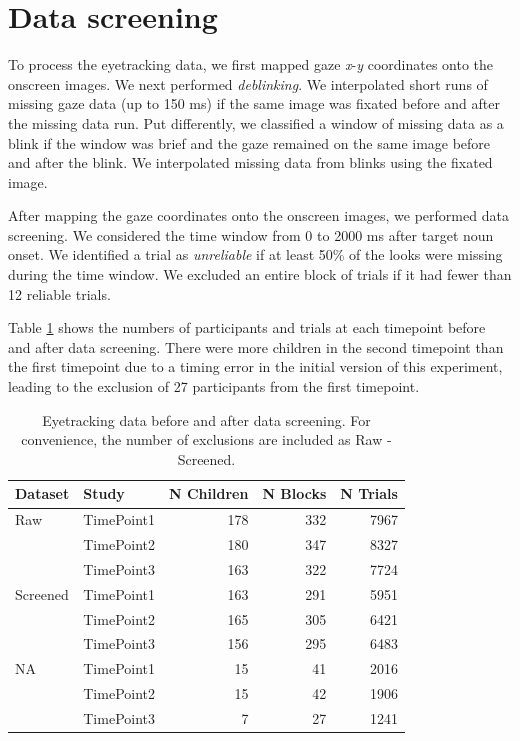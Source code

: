 \documentclass [11pt, proquest] {uwthesis}[2015/03/03]
\begin{document}
\section{Data screening}\label{data-screening}

To process the eyetracking data, we first mapped gaze \emph{x}-\emph{y}
coordinates onto the onscreen images. We next performed
\emph{deblinking}. We interpolated short runs of missing gaze data (up
to 150 ms) if the same image was fixated before and after the missing
data run. Put differently, we classified a window of missing data as a
blink if the window was brief and the gaze remained on the same image
before and after the blink. We interpolated missing data from blinks
using the fixated image.

After mapping the gaze coordinates onto the onscreen images, we
performed data screening. We considered the time window from 0 to 2000
ms after target noun onset. We identified a trial as \emph{unreliable}
if at least 50\% of the looks were missing during the time window. We
excluded an entire block of trials if it had fewer than 12 reliable
trials.

Table \ref{tab:screening-counts} shows the numbers of participants and
trials at each timepoint before and after data screening. There were
more children in the second timepoint than the first timepoint due to a
timing error in the initial version of this experiment, leading to the
exclusion of 27 participants from the first timepoint.
\begin{table}

\caption{\label{tab:screening-counts}Eyetracking data before and after data screening. For convenience, the number of exclusions are included as Raw - Screened.}
\centering
\begin{tabular}[t]{llrrr}
\toprule
Dataset & Study & N Children & N Blocks & N Trials\\
\midrule
Raw & TimePoint1 & 178 & 332 & 7967\\
 & TimePoint2 & 180 & 347 & 8327\\
 & TimePoint3 & 163 & 322 & 7724\\
Screened & TimePoint1 & 163 & 291 & 5951\\
 & TimePoint2 & 165 & 305 & 6421\\
\addlinespace
 & TimePoint3 & 156 & 295 & 6483\\
NA & TimePoint1 & 15 & 41 & 2016\\
 & TimePoint2 & 15 & 42 & 1906\\
 & TimePoint3 & 7 & 27 & 1241\\
\bottomrule
\end{tabular}
\end{table}
\end{document}

